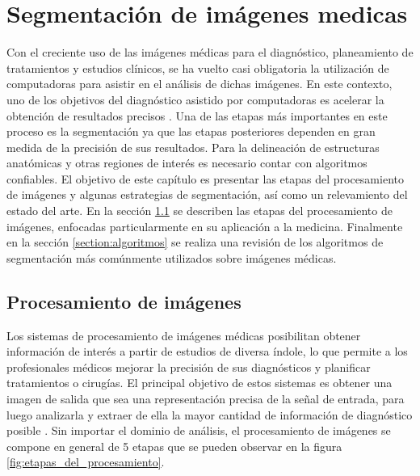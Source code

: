 \chapter{Segmentación de imágenes medicas}\label{chapter:segmencation}
Con el creciente uso de las imágenes médicas para el diagnóstico, planeamiento de tratamientos y estudios clínicos, se ha vuelto casi obligatoria la utilización de computadoras para asistir en el análisis de dichas imágenes. En este contexto, uno de los objetivos del diagnóstico asistido por computadoras es acelerar la obtención de resultados precisos \citep{Sharma2010}. Una de las etapas más importantes en este proceso es la segmentación ya que las etapas posteriores dependen en gran medida de la precisión de sus resultados. Para la delineación de estructuras anatómicas y otras regiones de interés es necesario contar con algoritmos confiables.
El objetivo de este capítulo es presentar las etapas del procesamiento de imágenes y algunas estrategias de segmentación, así como un relevamiento del estado del arte. En la sección \ref{section:procesamiento} se describen  las etapas del procesamiento de imágenes, enfocadas particularmente en su aplicación a la medicina. Finalmente en la sección \ref{section:algoritmos} se realiza una revisión de los algoritmos de segmentación más comúnmente utilizados sobre imágenes médicas.

\section{Procesamiento de imágenes}\label{section:procesamiento}
Los sistemas de procesamiento de imágenes médicas posibilitan obtener información de interés a partir de estudios de diversa índole, lo que permite a los profesionales médicos mejorar la precisión de sus diagnósticos y planificar tratamientos o cirugías. El principal objetivo de estos sistemas es obtener una imagen de salida que sea una representación precisa de la señal de entrada, para luego analizarla y extraer de ella la mayor cantidad de información de diagnóstico posible \citep{dougherty2009digital}. Sin importar el dominio de análisis, el procesamiento de imágenes se compone en general de 5 etapas que se pueden observar en la figura \ref{fig:etapas_del_procesamiento}.

